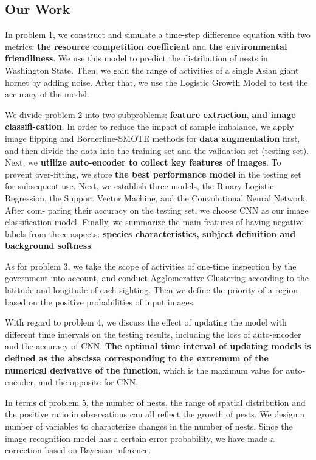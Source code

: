 \documentclass[../mcmpaper]{subfiles}
\begin{document}
    \subsection{Our Work}
    In problem 1, we construct and simulate a time-step diffierence equation with two metrics: \textbf{the resource competition coefficient} and \textbf{the environmental friendliness}. We use this model to predict the distribution of nests in Washington State. Then, we gain the range of activities of a single Asian giant hornet by adding noise. After that, we use the Logistic Growth Model to test the accuracy of the model.
    \par
    We divide problem 2 into two subproblems: \textbf{feature extraction}, \textbf{and image classifi-cation}. In order to reduce the impact of sample imbalance, we apply image flipping and Borderline-SMOTE methods for \textbf{data augmentation} first, and then divide the data into the training set and the validation set (testing set). Next, we \textbf{utilize auto-encoder to collect key features of images}. To prevent over-fitting, we store \textbf{the best performance model} in the testing set for subsequent use. Next, we establish three models, the Binary Logistic Regression, the Support Vector Machine, and the Convolutional Neural Network. After com- paring their accuracy on the testing set, we choose CNN as our image classification model. Finally, we summarize the main features of having negative labels from three aspects: \textbf{species characteristics, subject definition and background softness}.
    \par
    As for problem 3, we take the scope of activities of one-time inspection by the government into account, and conduct Agglomerative Clustering according to the latitude and longitude of each sighting. Then we define the priority of a region based on the positive probabilities of input images.
    \par
    With regard to problem 4, we discuss the eﬀect of updating the model with diﬀerent time intervals on the testing results, including the loss of auto-encoder and the accuracy of CNN. \textbf{The optimal time interval of updating models is defined as the abscissa corresponding to the extremum of the numerical derivative of the function}, which is the maximum value for auto-encoder, and the opposite for CNN.
    \par
    In terms of problem 5, the number of nests, the range of spatial distribution and the positive ratio in observations can all reflect the growth of pests. We design a number of variables to characterize changes in the number of nests. Since the image recognition model has a certain error probability, we have made a correction based on Bayesian inference.
\end{document}
